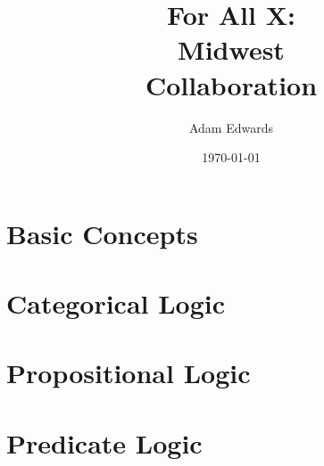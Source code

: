 \documentclass[nobib]{tufte-book}
\title{For All X: \\ Midwest \\ Collaboration}
\author[Adam Edwards]{Adam Edwards}
\date{\today}
\begin{document}

\frontmatter
\pagestyle{empty}
\setlength{\parindent}{0pt}
\setlength{\parskip}{\baselineskip}


\maketitle




\setlength{\parskip}{0em}
\begin{fullwidth}
\tableofcontents
\end{fullwidth}






\mainmatter

\label{full_version} %

\listoffigures %

\newpage
\listoftables %

%
\part{Basic Concepts} \label{part:basic_concepts}




\part{Categorical Logic}\label{part:cat_logic}



\part{Propositional Logic} \label{part:prop_logic}



%

\part{Predicate Logic} \label{part:pred_logic}



\end{document}
